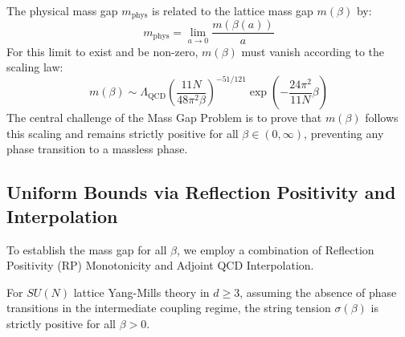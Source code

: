 The physical mass gap $m_{\text{phys}}$ is related to the lattice mass gap $m(\beta)$ by:
\begin{equation}
    m_{\text{phys}} = \lim_{a \to 0} \frac{m(\beta(a))}{a}
\end{equation}
For this limit to exist and be non-zero, $m(\beta)$ must vanish according to the scaling law:
\begin{equation}
    m(\beta) \sim \Lambda_{\text{QCD}} \left( \frac{11N}{48\pi^2 \beta} \right)^{-51/121} \exp\left( -\frac{24\pi^2}{11N} \beta \right)
\end{equation}
The central challenge of the Mass Gap Problem is to prove that $m(\beta)$ follows this scaling and remains strictly positive for all $\beta \in (0, \infty)$, preventing any phase transition to a massless phase.

\subsection{Uniform Bounds via Reflection Positivity and Interpolation}
\label{sec:uniform-bounds}

To establish the mass gap for all $\beta$, we employ a combination of Reflection Positivity (RP) Monotonicity and Adjoint QCD Interpolation.

\begin{theorem}
    For $SU(N)$ lattice Yang-Mills theory in $d \ge 3$, assuming the absence of phase transitions in the intermediate coupling regime, the string tension $\sigma(\beta)$ is strictly positive for all $\beta > 0$.
\end{theorem}

